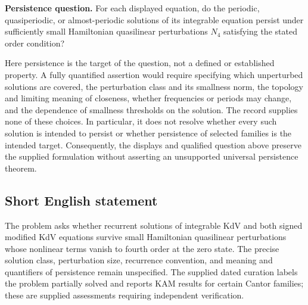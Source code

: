 \documentclass[11pt]{article}
\begin{document}
\textbf{Persistence question.} For each displayed equation, do the periodic, quasiperiodic, or almost-periodic solutions of its integrable equation persist under sufficiently small Hamiltonian quasilinear perturbations \(N_4\) satisfying the stated order condition?

Here persistence is the target of the question, not a defined or established property. A fully quantified assertion would require specifying which unperturbed solutions are covered, the perturbation class and its smallness norm, the topology and limiting meaning of closeness, whether frequencies or periods may change, and the dependence of smallness thresholds on the solution. The record supplies none of these choices. In particular, it does not resolve whether every such solution is intended to persist or whether persistence of selected families is the intended target. Consequently, the displays and qualified question above preserve the supplied formulation without asserting an unsupported universal persistence theorem.
\subsection{Short English statement}
The problem asks whether recurrent solutions of integrable KdV and both signed modified KdV equations survive small Hamiltonian quasilinear perturbations whose nonlinear terms vanish to fourth order at the zero state. The precise solution class, perturbation size, recurrence convention, and meaning and quantifiers of persistence remain unspecified. The supplied dated curation labels the problem partially solved and reports KAM results for certain Cantor families; these are supplied assessments requiring independent verification.
\end{document}
